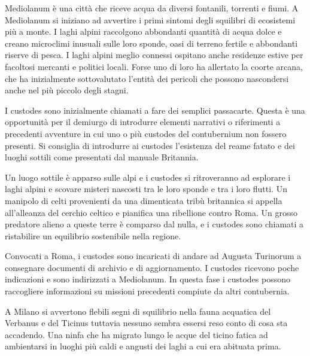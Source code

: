 \documentclass[11.5pt,twocolumn]{article}
\begin{document}
%
Mediolanum \`{e} una citt\`{a} che riceve acqua da diversi fontanili, torrenti e fiumi.
A Mediolanum si iniziano ad avvertire i primi sintomi degli squilibri di ecosistemi pi\`{u} a monte.
I laghi alpini raccolgono abbondanti quantit\`{a} di acqua dolce e creano microclimi inusuali sulle loro sponde, oasi di terreno fertile e abbondanti riserve di pesca.
I laghi alpini meglio connessi ospitano anche residenze estive per facoltosi mercanti e politici locali.
Forse uno di loro ha allertato la coorte arcana, che ha inizialmente sottovalutato l'entit\`{a} dei pericoli che possono nascondersi anche nel pi\`{u} piccolo degli stagni.

I custodes sono inizialmente chiamati a fare dei semplici passacarte.
Questa \`{e} una opportunit\`{a} per il demiurgo di introdurre elementi narrativi o riferimenti a precedenti avventure in cui uno o pi\`{u} custodes del contubernium non fossero presenti.
Si consiglia di introdurre ai custodes l'esistenza del reame fatato e dei luoghi sottili come presentati dal manuale Britannia.~\cite{britannia_en}

Un luogo sottile \`{e} apparso sulle alpi e i custodes si ritroveranno ad esplorare i laghi alpini e scovare misteri nascosti tra le loro sponde e tra i loro flutti.
Un manipolo di celti provenienti da una dimenticata trib\`{u} britannica si appella all'alleanza del cerchio celtico e pianifica una ribellione contro Roma.
Un grosso predatore alieno a queste terre \`{e} comparso dal nulla,
e i custodes sono chiamati a ristabilire un equilibrio sostenibile nella regione.

%
Convocati a Roma, i custodes sono incaricati di andare ad Augusta Turinorum a consegnare documenti di archivio e di aggiornamento.
I custodes ricevono poche indicazioni e sono indirizzati a Mediolanum.
In questa fase i custodes possono raccogliere informazioni su missioni precedenti compiute da altri contubernia.

%
A Milano si avvertono flebili segni di squilibrio nella fauna acquatica del Verbanus e del Ticinus tuttavia nessuno sembra essersi reso conto di cosa sta accadendo.
Una ninfa che ha migrato lungo le acque del ticino fatica ad ambientarsi in luoghi pi\`{u} caldi e angusti dei laghi a cui era abituata prima.
\end{document}
